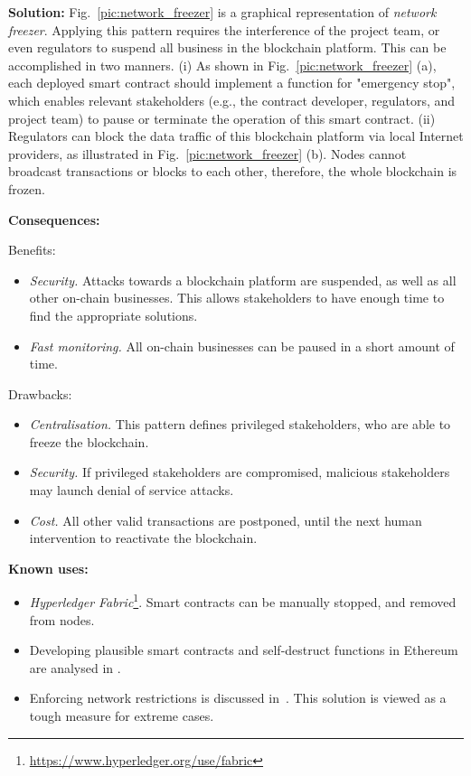 \documentclass{article}
\begin{document}
\vspace{0.5em}\noindent \textbf{Solution:}  Fig.~\ref{pic:network_freezer} is a graphical representation of \textit{network freezer}. Applying this pattern requires the interference of the project team, or even regulators to suspend all business in the blockchain platform. This can be accomplished in two manners. (i) As shown in Fig.~\ref{pic:network_freezer} (a), each deployed smart contract should implement a function for "emergency stop", which enables relevant stakeholders (e.g., the contract developer, regulators, and project team) to pause or terminate the operation of this smart contract. (ii) Regulators can block the data traffic of this blockchain platform via local Internet providers, as illustrated in Fig.~\ref{pic:network_freezer} (b). Nodes cannot broadcast transactions or blocks to each other, therefore, the whole blockchain is frozen.


\vspace{0.5em}\noindent \textbf{Consequences:} 

Benefits:
\begin{itemize}
  \item \textit{Security.} Attacks towards a blockchain platform are suspended, as well as all other on-chain businesses. This allows stakeholders to have enough time to find the appropriate solutions.
  
  \item \textit{Fast monitoring.} All on-chain businesses can be paused in a short amount of time.
\end{itemize}

Drawbacks:
\begin{itemize}
  \item \textit{Centralisation.} This pattern defines privileged stakeholders, who are able to freeze the blockchain.
  
  \item \textit{Security.} If privileged stakeholders are compromised, malicious stakeholders may launch denial of service attacks.
  
  \item \textit{Cost.} All other valid transactions are postponed, until the next human intervention to reactivate the blockchain.
\end{itemize}


\vspace{0.5em}\noindent \textbf{Known uses:}  
 \begin{itemize}
   \item \textit{Hyperledger Fabric}\footnote{\url{https://www.hyperledger.org/use/fabric}}. Smart contracts can be manually stopped, and removed from nodes.
 
   \item Developing plausible smart contracts and self-destruct functions in Ethereum are analysed in \cite{wohrer2018smart}.
   
   \item Enforcing network restrictions is discussed in~\cite{selected16, selected25}. This solution is viewed as a tough measure for extreme cases.
 \end{itemize}
 
\end{document}
